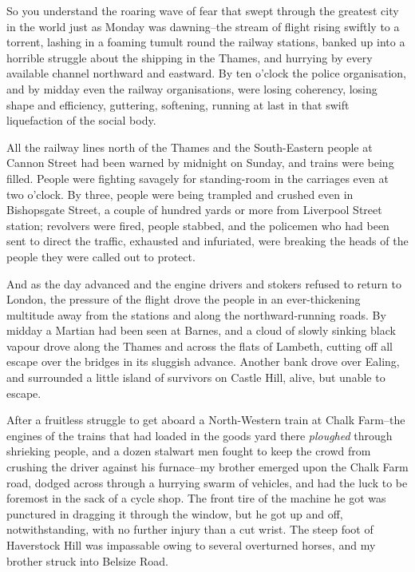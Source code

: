 So you understand the roaring wave of fear that swept through the
greatest city in the world just as Monday was dawning--the stream
of flight rising swiftly to a torrent, lashing in a foaming tumult
round the railway stations, banked up into a horrible struggle
about the shipping in the Thames, and hurrying by every available
channel northward and eastward. By ten o'clock the police
organisation, and by midday even the railway organisations, were
losing coherency, losing shape and efficiency, guttering,
softening, running at last in that swift liquefaction of the social
body.

All the railway lines north of the Thames and the South-Eastern
people at Cannon Street had been warned by midnight on Sunday, and
trains were being filled. People were fighting savagely for
standing-room in the carriages even at two o'clock. By three,
people were being trampled and crushed even in Bishopsgate Street,
a couple of hundred yards or more from Liverpool Street station;
revolvers were fired, people stabbed, and the policemen who had
been sent to direct the traffic, exhausted and infuriated, were
breaking the heads of the people they were called out to protect.

And as the day advanced and the engine drivers and stokers refused
to return to London, the pressure of the flight drove the people in
an ever-thickening multitude away from the stations and along the
northward-running roads. By midday a Martian had been seen at
Barnes, and a cloud of slowly sinking black vapour drove along the
Thames and across the flats of Lambeth, cutting off all escape over
the bridges in its sluggish advance. Another bank drove over
Ealing, and surrounded a little island of survivors on Castle Hill,
alive, but unable to escape.

After a fruitless struggle to get aboard a North-Western train at
Chalk Farm--the engines of the trains that had loaded in the goods
yard there \emph{ploughed} through shrieking people, and a dozen
stalwart men fought to keep the crowd from crushing the driver
against his furnace--my brother emerged upon the Chalk Farm road,
dodged across through a hurrying swarm of vehicles, and had the
luck to be foremost in the sack of a cycle shop. The front tire of
the machine he got was punctured in dragging it through the window,
but he got up and off, notwithstanding, with no further injury than
a cut wrist. The steep foot of Haverstock Hill was impassable owing
to several overturned horses, and my brother struck into Belsize
Road.

